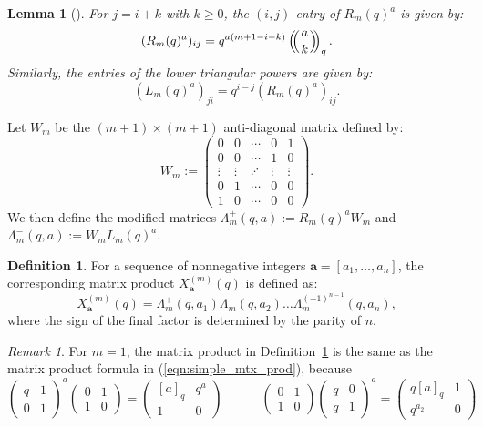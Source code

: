 \documentclass[11pt]{amsart}
\newcommand\m[1]{\begin{pmatrix}#1\end{pmatrix}}
\newtheorem{lem}[thm]{Lemma}
\theoremstyle{definition}
\newtheorem{defn}[thm]{Definition}
\theoremstyle{remark}
\newtheorem{rem}[thm]{Remark}
\numberwithin{equation}{section}
\def\multiset#1#2{\ensuremath{\left(\kern-.3em\left(\genfrac{}{}{0pt}{}{#1}{#2}\right)\kern-.3em\right)}}
\def\multiset#1#2{\ensuremath{\left(\kern-.3em\left(\genfrac{}{}{0pt}{}{#1}{#2}\right)\kern-.3em\right)}}
\begin{document}
\begin{lem}[{\cite[Lemma 3.2]{BOSZ26}}]\label{lem:matrix_entries}
    For $j = i+k$ with $k \geq 0$, the $(i,j)$-entry of $R_m(q)^a$ is given by:
    \[
    (R_m(q)^a)_{ij} = q^{a(m+1-i-k)} \multiset{a}{k}_q.
    \]
    Similarly, the entries of the lower triangular powers are given by:
    \[
    (L_m(q)^a)_{ji} = q^{i-j} (R_m(q)^a)_{ij}.
    \]
\end{lem}

Let $W_m$ be the $(m+1) \times (m+1)$ anti-diagonal matrix defined by:
\[
W_m := \begin{pmatrix}
    0 & 0 & \cdots & 0 & 1 \\
    0 & 0 & \cdots & 1 & 0 \\
    \vdots & \vdots & \iddots & \vdots & \vdots \\
    0 & 1 & \cdots & 0 & 0 \\
    1 & 0 & \cdots & 0 & 0
\end{pmatrix}.
\]
We then define the modified matrices $\Lambda_m^+(q,a) := R_m(q)^a W_m$ and $\Lambda_m^-(q,a) := W_m L_m(q)^a$.


\begin{defn}\label{def:graph_matrix}
    For a sequence of nonnegative integers \(\mathbf{a}=[a_1, \dots, a_n]\), the corresponding matrix product $X^{(m)}_{\mathbf{a}}(q)$ is defined as:
    \[
    X^{(m)}_{\mathbf{a}}(q) = \Lambda_m^+(q,a_1) \Lambda_m^-(q,a_2) \dots \Lambda_m^{(-1)^{n-1}}(q,a_n),
    \]
    where the sign of the final factor is determined by the parity of $n$.
\end{defn}

\begin{rem}\label{rem: convert_product}
    For $m=1$, the matrix product in Definition~\ref{def:graph_matrix} is the same as the matrix product formula in (\ref{eqn:simple_mtx_prod}), because $$\m{q& 1\\0&1}^{a}\m{0&1\\1&0} = \m{[a]_q&q^a\\1&0}\quad\quad\quad\m{0&1\\1&0}\m{q& 0\\q&1}^{a} = \m{q[a]_q&1\\q^{a_2}&0}$$
\end{rem}
\end{document}
